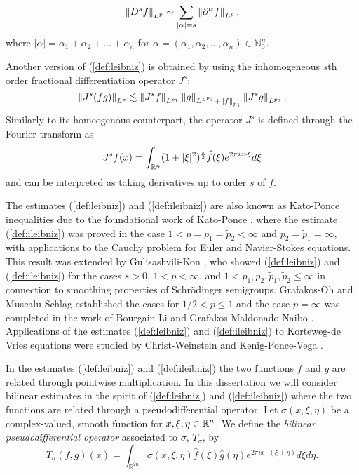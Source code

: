 
\[\left\|D^s f\right\|_{L^p} \sim \sum_{|\alpha| = s} \left\|\partial^\alpha f\right\|_{L^p},\]
where $|\alpha| = \alpha_1 + \alpha_2 + ... + \alpha_n$ for $\alpha = (\alpha_1,\alpha_2,...,\alpha_n) \in \mathbb{N}^n_0.$

 Another version of (\ref{def:leibniz}) is obtained by using the inhomogeneous $s$th order fractional differentiation operator $J^s$:
\begin{equation}\label{def:ileibniz}
\left\|J^s(fg)\right\|_{L^p} \lesssim \left\|J^s f\right\|_{L^{p_1}}\left\|g\right\|_{L^{L^{p_2}} + \left\|f\right\|_{\tilde{p}_1}}\left\|J^s g\right\|_{L^{\tilde{p}_2}}.
\end{equation}
Similarly to its homeogenous counterpart, the operator $J^s$ is defined through the Fourier transform as 
\[ J^s f(x) = \int_{{{\mathbb R}^n}} (1+|\xi|^2)^\frac{s}{2} \widehat{f}(\xi)e^{2\pi i x\cdot\xi} d\xi\]
and can be interpreted as taking derivatives up to order $s$ of $f$.
 
The estimates (\ref{def:leibniz}) and (\ref{def:ileibniz}) are also known as Kato-Ponce inequalities due to the foundational work of Kato-Ponce \cite{MR951744}, where the estimate (\ref{def:ileibniz}) was proved in the case $1<p=p_1=\tilde{p}_2<\infty$ and $p_2=\tilde{p}_1=\infty$, with applications to the Cauchy problem for Euler and Navier-Stokes equations. This result was extended by Gulisashvili-Kon \cite{MR1420922}, who showed (\ref{def:leibniz}) and (\ref{def:ileibniz}) for the cases $s>0$, $1<p<\infty$, and $1 < p_1,p_2,\tilde{p}_1,\tilde{p}_2\leq\infty$ in connection to smoothing properties of Schr\"odinger semigroups. Grafakos-Oh \cite{MR3200091} and Muscalu-Schlag \cite{MR3052499} established the cases for $1/2 <p\leq 1$ and the case $p=\infty$ was completed in the work of Bourgain-Li \cite{MR3263081} and Grafakos-Maldonado-Naibo \cite{MR3189525}. Applications of the estimates (\ref{def:leibniz}) and (\ref{def:ileibniz}) to Korteweg-de Vries equations were studied by Christ-Weinstein \cite{MR1124294} and Kenig-Ponce-Vega \cite{MR1211741}.

In the estimates (\ref{def:leibniz}) and (\ref{def:ileibniz}) the two functions $f$ and $g$ are related through pointwise multiplication. In this dissertation we will consider bilinear estimates in the spirit of (\ref{def:leibniz}) and (\ref{def:ileibniz}) where the two functions are related through a pseudodifferential operator. Let $\sigma(x,\xi,\eta)$ be a complex-valued, smooth function for $x,\xi,\eta\in{{\mathbb R}^n}$. We define the \textit{bilinear pseudodifferential operator}  associated to $\sigma$, $T_\sigma$, by 
\begin{equation}\label{psydo}
T_{\sigma}(f,g)(x) = \int_{\mathbb{R}^{2n}} \sigma(x,\xi,\eta) \widehat{f}(\xi)\widehat{g}(\eta)e^{2\pi i x\cdot(\xi+\eta)}d\xi d\eta. 
\end{equation}

